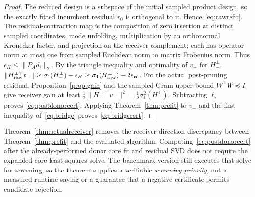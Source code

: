 \documentclass[review,10pt]{elsarticle}
\begin{document}
\begin{proof}
The reduced design is a subspace of the initial sampled product design, so the exactly fitted incumbent residual $r_0$ is orthogonal to it. Hence~\eqref{eq:rawrefit}. The residual-contraction map is the composition of zero insertion at distinct sampled coordinates, mode unfolding, multiplication by an orthonormal Kronecker factor, and projection on the receiver complement; each has operator norm at most one from sampled Euclidean norm to matrix Frobenius norm. Thus $\epsilon_H\le\|P_A d_i\|_2$. By the triangle inequality and optimality of $v_-$ for $H_-^{\perp}$,
$\|H_{\rm raw}^{\perp\top}v_-\|\ge\sigma_1(H_-^{\perp})-\epsilon_H\ge\sigma_1(H_{\rm raw}^{\perp})-2\epsilon_H$.
For the actual post-pruning residual, Proposition~\ref{prop:gain} and the sampled Gram upper bound $W^\top W\preceq I$ give receiver gain at least $\frac12\|H_-^{\perp\top}v_-\|^2=\frac12\sigma_1^2(H_-^{\perp})$. Subtracting $\ell_i$ proves~\eqref{eq:postdonorcert}. Applying Theorem~\ref{thm:prefit} to $v_-$ and the first inequality of~\eqref{eq:bridge} proves~\eqref{eq:bridgecert}.
\end{proof}

Theorem~\ref{thm:actualreceiver} removes the receiver-direction discrepancy between Theorem~\ref{thm:prefit} and the evaluated algorithm. Computing~\eqref{eq:postdonorcert} after the already-performed donor core fit and residual SVD does not require the expanded-core least-squares solve. The benchmark version still executes that solve for screening, so the theorem supplies a verifiable \emph{screening priority}, not a measured runtime saving or a guarantee that a negative certificate permits candidate rejection.
\end{document}
